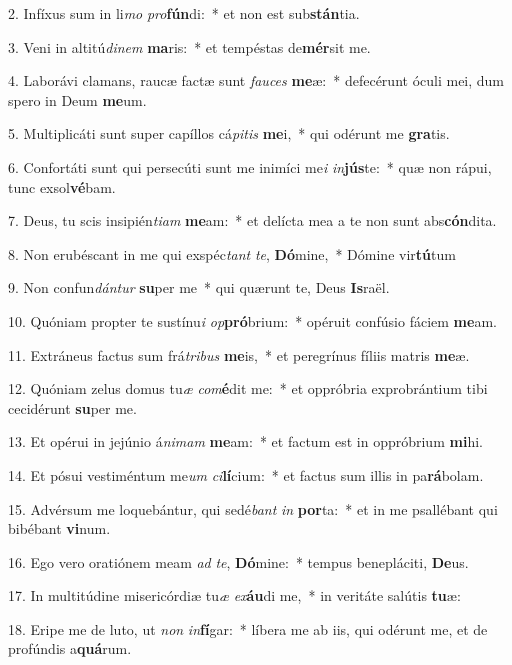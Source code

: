 2. Infíxus sum in li\textit{mo} \textit{pro}\textbf{fún}di:~*  et non est sub\textbf{stán}tia.\

3. Veni in altitú\textit{di}\textit{nem} \textbf{ma}ris:~*  et tempéstas de\textbf{mér}sit me.\

4. Laborávi clamans, raucæ factæ sunt \textit{fau}\textit{ces} \textbf{me}æ:~*  defecérunt óculi mei, dum spero in Deum \textbf{me}um.\

5. Multiplicáti sunt super capíllos cá\textit{pi}\textit{tis} \textbf{me}i,~*  qui odérunt me \textbf{gra}tis.\

6. Confortáti sunt qui persecúti sunt me inimíci me\textit{i} \textit{in}\textbf{jús}te:~*  quæ non rápui, tunc exsol\textbf{vé}bam.\

7. Deus, tu scis insipién\textit{ti}\textit{am} \textbf{me}am:~*  et delícta mea a te non sunt abs\textbf{cón}dita.\

8. Non erubéscant in me qui exspéc\textit{tant} \textit{te}, \textbf{Dó}mine,~*  Dómine vir\textbf{tú}tum\

9. Non confun\textit{dán}\textit{tur} \textbf{su}per me~*  qui quærunt te, Deus \textbf{Is}raël.\

10. Quóniam propter te sustínu\textit{i} \textit{op}\textbf{pró}brium:~*  opéruit confúsio fáciem \textbf{me}am.\

11. Extráneus factus sum frá\textit{tri}\textit{bus} \textbf{me}is,~*  et peregrínus fíliis matris \textbf{me}æ.\

12. Quóniam zelus domus tu\textit{æ} \textit{com}\textbf{é}dit me:~*  et oppróbria exprobrántium tibi cecidérunt \textbf{su}per me.\

13. Et opérui in jejúnio á\textit{ni}\textit{mam} \textbf{me}am:~*  et factum est in oppróbrium \textbf{mi}hi.\

14. Et pósui vestiméntum me\textit{um} \textit{ci}\textbf{lí}cium:~*  et factus sum illis in pa\textbf{rá}bolam.\

15. Advérsum me loquebántur, qui sedé\textit{bant} \textit{in} \textbf{por}ta:~*  et in me psallébant qui bibébant \textbf{vi}num.\

16. Ego vero oratiónem meam \textit{ad} \textit{te}, \textbf{Dó}mine:~*  tempus benepláciti, \textbf{De}us.\

17. In multitúdine misericórdiæ tu\textit{æ} \textit{ex}\textbf{áu}di me,~*  in veritáte salútis \textbf{tu}æ:\

18. Eripe me de luto, ut \textit{non} \textit{in}\textbf{fí}gar:~*  líbera me ab iis, qui odérunt me, et de profúndis a\textbf{quá}rum.\

